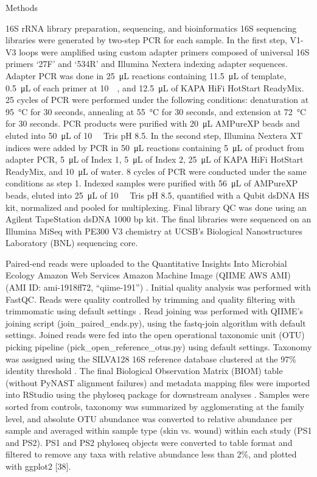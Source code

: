 \documentclass[oneside,12pt,final]{sty/ucthesis-CA2012}
\begin{document}
\begin{mainmatter}
\begin{section}{Methods}
\begin{subsection}{16S rRNA library preparation, sequencing, and bioinformatics}
16S sequencing libraries were generated by two-step PCR for each sample. In the first step, V1-V3 loops were amplified using custom adapter primers composed of universal 16S primers ‘27F’ and ‘534R’ and Illumina Nextera indexing adapter sequences. Adapter PCR was done in \SI{25}{\micro\liter} reactions containing \SI{11.5}{\micro\liter} of template, \SI{0.5}{\micro\liter} of each primer at \SI{10}{\micro\molar}, and \SI{12.5}{\micro\liter} of KAPA HiFi HotStart ReadyMix. 25 cycles of PCR were performed under the following conditions: denaturation at \SI{95}{\celsius} for 30 seconds, annealing at \SI{55}{\celsius} for 30 seconds, and extension at \SI{72}{\celsius} for 30 seconds. PCR products were purified with \SI{20}{\micro\liter} AMPureXP beads and eluted into \SI{50}{\micro\liter} of \SI{10}{\milli\molar} Tris pH 8.5. In the second step, Illumina Nextera XT indices were added by PCR in \SI{50}{\micro\liter} reactions containing \SI{5}{\micro\liter} of product from adapter PCR, \SI{5}{\micro\liter} of Index 1, \SI{5}{\micro\liter} of Index 2, \SI{25}{\micro\liter} of KAPA HiFi HotStart ReadyMix, and \SI{10}{\micro\liter} of water. 8 cycles of PCR were conducted under the same conditions as step 1. Indexed samples were purified with \SI{56}{\micro\liter} of AMPureXP beads, eluted into \SI{25}{\micro\liter} of \SI{10}{\milli\molar} Tris pH 8.5, quantified with a Qubit dsDNA HS kit, normalized and pooled for multiplexing. Final library QC was done using an Agilent TapeStation dsDNA 1000 bp kit. The final libraries were sequenced on an Illumina MiSeq with PE300 V3 chemistry at UCSB’s Biological Nanostructures Laboratory (BNL) sequencing core.

Paired-end reads were uploaded to the Quantitative Insights Into Microbial Ecology Amazon Web Services Amazon Machine Image (QIIME AWS AMI) (AMI ID: ami-1918ff72, “qiime-191”) \cite{RN81}. Initial quality analysis was performed with FastQC. Reads were quality controlled by trimming and quality filtering with trimmomatic using default settings \cite{RN82}. Read joining was performed with QIIME’s joining script (join\_paired\_ends.py), using the fastq-join algorithm with default settings. Joined reads were fed into the open operational taxonomic unit (OTU) picking pipeline (pick\_open\_reference\_otus.py) using default settings. Taxonomy was assigned using the SILVA128 16S reference database clustered at the 97\% identity threshold \cite{RN35}. The final Biological Observation Matrix (BIOM) table (without PyNAST alignment failures) and metadata mapping files were imported into RStudio using the phyloseq package for downstream analyses \cite{RN45}. Samples were sorted from controls, taxonomy was summarized by agglomerating at the family level, and absolute OTU abundance was converted to relative abundance per sample and averaged within sample type (skin vs. wound) within each study (PS1 and PS2). PS1 and PS2 phyloseq objects were converted to table format and filtered to remove any taxa with relative abundance less than 2\%, and plotted with ggplot2 [38].
\end{subsection}


\end{section}
\end{mainmatter}
\end{document}
